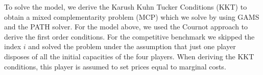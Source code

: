 To solve the model, we derive the Karush Kuhn Tucker Conditions (KKT) to obtain a mixed complementarity problem (MCP) which we solve by using GAMS and the PATH solver. For the model above, we used the Cournot approach to derive the first order conditions. For the competitive benchmark we skipped the index $i$ and solved the problem under the assumption that just one player disposes of all the initial capacities of the four players. When deriving the KKT conditions, this player is assumed to set prices equal to marginal costs.


